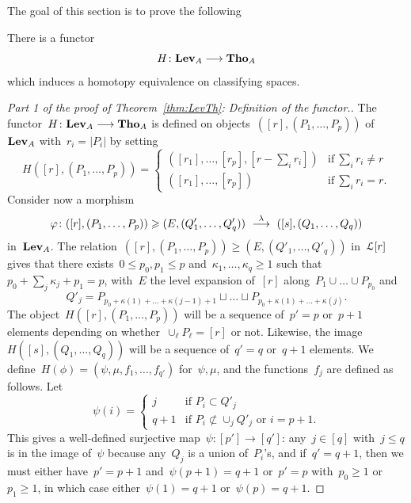 The goal of this section is to prove the following

\begin{theorem}\label{thm:LevTh}
There is a functor
$$H\colon\mathbf{Lev}_A\longrightarrow \mathbf{Tho}_A$$
which induces a homotopy equivalence on classifying spaces. 
\end{theorem}

\begin{proof}[Part 1 of the proof of Theorem~\ref{thm:LevTh}: Definition of the functor.]
The functor~$H\colon\mathbf{Lev}_A\longrightarrow \mathbf{Tho}_A$ is defined on objects~$([r],(P_1,\dots,P_p))$ of~$\mathbf{Lev}_A$ with~$r_i=|P_i|$  by setting 
\[
H([r],(P_1,\dots,P_p))=\left\{\begin{array}{ll}([r_1],\dots,[r_p],[r-\sum_ir_i]) & \textrm{if}\ \sum_i r_i\neq r\\
([r_1],\dots,[r_p]) & \textrm{if}\ \sum_i r_i= r.
\end{array}\right.
\]
Consider now a morphism 
$$\phi\colon([r],(P_1,\dots,P_p)) \ge (E,(Q'_1,\dots,Q'_q))\ \stackrel{\la}\rar\ ([s],(Q_1,\dots,Q_q))$$ in~$\mathbf{Lev}_A$.
The relation~$([r],(P_1,\dots,P_p))\ge (E,(Q'_1,\dots,Q'_q))$ in~$\mathcal{L}[r]$ gives that 
there exists~$0\le p_0,p_1\le p$ and~$\kappa_1,\dots,\kappa_q\ge 1$ such that~$p_0+\sum_j \kappa_j+p_1=p$, with~$E$ the level expansion of~$[r]$ along~$P_1\cup \dots\cup P_{p_0}$ and
\[
Q'_j=P_{p_0+\kappa(1)+\dots+\kappa(j-1)+1}\sqcup\dots\sqcup P_{p_0+\kappa(1)+\dots+\kappa(j)}.
\]
The object~$H([r],(P_1,\dots,P_p))$ will be a sequence of~$p'=p$ or~$p+1$ elements depending on whether~\hbox{$\cup_\ell P_\ell=[r]$} or not. Likewise, the image~$H([s],(Q_1,\dots,Q_q))$ will be a sequence of~$q'=q$ or~$q+1$ elements. 
We define~$H(\phi)=(\psi,\mu,f_1,\dots,f_{q'})$ for~$\psi,\mu$, and the functions~$f_j$ are defined as follows. Let 
\[
\psi(i)=
\begin{cases}
j 	& \textrm{if }P_i\subset Q'_j \\
q+1 & \textrm{if }P_i\not\subset\cup_j Q'_j\textrm{ or }i=p+1.
\end{cases}
\]
This gives a well-defined surjective map~$\psi\colon[p']\to [q']$: any~$j\in [q]$ with~$j\le q$ is in the image of~$\psi$ because any~$Q_j$ is a union of~$P_i$'s, and if~$q'=q+1$, then we must either have~$p'=p+1$ and~$\psi(p+1)=q+1$ or~$p'=p$ with~$p_0\ge 1$ or~$p_1\ge 1$, in which case either~$\psi(1)=q+1$ or~$\psi(p)=q+1$.    

\end{proof}
